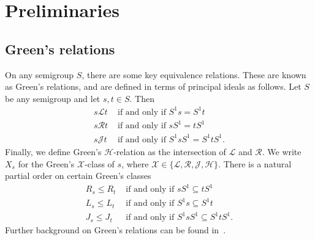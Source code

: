 \documentclass[11pt]{article}
\numberwithin{equation}{section}
\newcommand{\B}{\mathbb{B}}
\newcommand{\Bn}{M_n(\B)}
\newcommand{\Refn}{M_n^{\text{id}}(\B)}
\renewcommand{\L}{\mathscr{L}}
\newcommand{\R}{\mathscr{R}}
\newcommand{\J}{\mathscr{J}}
\renewcommand{\H}{\mathscr{H}}
\begin{document}
%
%



\section{Preliminaries}
\label{section-preliminaries}

\subsection{Green's relations}
On any semigroup $S$, there are some key equivalence relations. These are known
as Green's relations, and are defined in terms of principal ideals as follows.
Let $S$ be any semigroup and let $s, t \in S$. Then
\begin{align*}
  s \L t &\text{ if and only if } S^1 s = S^1 t \\
  s \R t &\text{ if and only if } s S^1 = t S^1 \\
  s \J t &\text{ if and only if } S^1 s S^1 = S^1 t S^1.
\end{align*}
Finally, we define Green's $\H$-relation as the intersection of $\L$ and $\R$.
We write $X_s$ for the Green's $\mathcal{X}$-class of $s$, where
$\mathcal{X} \in \{\L, \R, \J, \H\}$.
There is a natural partial order on certain Green's classes
\begin{align*}
  R_s \leq R_t &\text{ if and only if } sS^1 \subseteq tS^1 \\
  L_s \leq L_t &\text{ if and only if } S^1s \subseteq S^1t \\
  J_s \leq J_t &\text{ if and only if } S^1 s S^1 \subseteq S^1 t S^1.
\end{align*}
Further background on Green's relations can be found in~\cite{Howie1995aa}.
\end{document}

